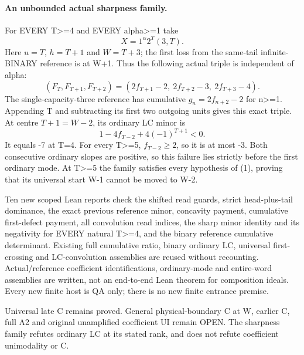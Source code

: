 \paragraph{An unbounded actual sharpness family.}
For EVERY T>=4 and EVERY alpha>=1 take
\[
                              X=1^\alpha2^T(3,T).
\]
Here $u=T$, $h=T+1$ and $W=T+3$; the first loss from the same-tail
infinite-BINARY reference is at W+1. Thus the following actual triple
is independent of alpha:
\[
 (F_T,F_{T+1},F_{T+2})
       =(2f_{T+1}-2,\ 2f_{T+2}-3,\ 2f_{T+3}-4).
\]
The single-capacity-three reference has cumulative
$g_n=2f_{n+2}-2$ for n>=1. Appending T and subtracting its first two
outgoing units gives this exact triple.
At centre $T+1=W-2$, its ordinary LC minor is
\[
                         1-4f_{T-2}+4(-1)^{T+1}<0.
\]
It equals -7 at T=4. For every T>=5, $f_{T-2}\ge2$, so it is at most -3.
Both consecutive ordinary slopes are positive, so this failure lies
strictly before the first ordinary mode. At T>=5 the family satisfies
every hypothesis of (1), proving that its universal start W-1 cannot
be moved to W-2.

Ten new scoped Lean reports check the shifted read guards,
strict head-plus-tail dominance, the exact previous reference minor,
concavity payment, cumulative first-defect payment, all convolution
read indices, the sharp minor identity and its negativity for EVERY
natural T>=4, and the binary reference cumulative determinant.
Existing full cumulative ratio, binary ordinary LC, universal first-
crossing and LC-convolution assemblies are reused without recounting.
Actual/reference coefficient identifications, ordinary-mode and
entire-word assemblies are written, not an end-to-end Lean theorem
for composition ideals. Every new finite host is QA only; there is
no new finite entrance premise.

Universal late C remains proved. General physical-boundary C at W,
earlier C, full A2 and original unamplified coefficient UI remain OPEN.
The sharpness family refutes ordinary LC at its stated rank, and
does not refute coefficient unimodality or C.


